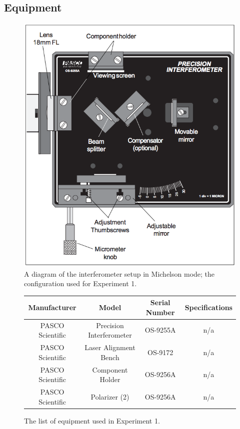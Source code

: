 \documentclass[12pt]{article}
\begin{document}
\subsection{Equipment}

\begin{figure}[H]
  \label{pic:equip1}
  \begin{center}
    \includegraphics[scale=0.7]{equip1.png}
  \end{center}
  \caption{A diagram of the interferometer setup in Michelson mode; the
    configuration used for Experiment 1.}
\end{figure}

\begin{figure}[H]
  \label{tab:equip1List}
  \caption{The list of equipment used in Experiment 1.}
  \begin{center}
    \begin{tabular}{|c|c|c|c|}
      \hline
      Manufacturer & Model & Serial Number & Specifications \\
      \hline
      PASCO Scientific & Precision Interferometer & OS-9255A & n/a \\
      PASCO Scientific & Laser Alignment Bench    & OS-9172  & n/a \\
      PASCO Scientific & Component Holder         & OS-9256A & n/a \\
      PASCO Scientific & Polarizer (2)            & OS-9256A & n/a \\
      \hline
    \end{tabular}
  \end{center}
\end{figure}
\end{document}
